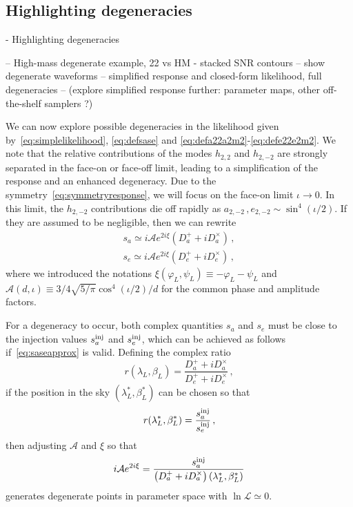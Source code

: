 \documentclass[aps,showpacs,twocolumn,prd,superscriptaddress,nofootinbib]{revtex4}
\newcommand{\be}{\begin{equation}}
\newcommand{\ee}{\end{equation}}
\newcommand{\bsub}{\begin{subequations}}
\newcommand{\esub}{\end{subequations}}
\newcommand\calL{{\mathcal{L}}}
\newcommand\calA{{\mathcal{A}}}
\newcommand\betaL{{\beta_{L}}}
\newcommand\lambdaL{{\lambda_{L}}}
\newcommand\varphiL{{\varphi_{L}}}
\newcommand\psiL{{\psi_{L}}}
\begin{document}

\subsection{Highlighting degeneracies}
\label{sec:SMBHPEdegen}

- Highlighting degeneracies

-- High-mass degenerate example, 22 vs HM - stacked SNR contours
-- show degenerate waveforms
-- simplified response and closed-form likelihood, full degeneracies
-- (explore simplified response further: parameter maps, other off-the-shelf samplers ?)

We can now explore possible degeneracies in the likelihood given by~\eqref{eq:simplelikelihood}, \eqref{eq:defsase} and \eqref{eq:defa22a2m2}-\eqref{eq:defe22e2m2}. We note that the relative contributions of the modes $h_{2,2}$ and $h_{2,-2}$ are strongly separated in the face-on or face-off limit, leading to a simplification of the response and an enhanced degeneracy. Due to the symmetry~\eqref{eq:symmetryresponse}, we will focus on the face-on limit $\iota \rightarrow 0$. In this limit, the $h_{2,-2}$ contributions die off rapidly as $a_{2,-2}\,, e_{2,-2} \sim \sin^{4} (\iota/2)$. If they are assumed to be negligible, then we can rewrite
\bsub\label{eq:saseapprox}
\begin{align}
	s_{a} \simeq i\calA e^{2 i \xi} \left( D_{a}^{+} + i D_{a}^{\times} \right) \,, \\
	s_{e} \simeq i\calA e^{2 i \xi} \left( D_{e}^{+} + i D_{e}^{\times} \right) \,,
\end{align}
\esub
where we introduced the notations $\xi (\varphiL, \psiL) \equiv -\varphiL - \psiL$ and $\calA(d, \iota) \equiv 3/4\sqrt{5/\pi}\cos^{4}(\iota/2)/d $ for the common phase and amplitude factors.

For a degeneracy to occur, both complex quantities $s_{a}$ and $s_{e}$ must be close to the injection values $s_{a}^{\rm inj}$ and $s_{e}^{\rm inj}$, which can be achieved as follows if~\eqref{eq:saseapprox} is valid. Defining the complex ratio
\be\label{eq:defr}
	r(\lambdaL, \betaL) = \frac{D_{a}^{+} + i D_{a}^{\times}}{D_{e}^{+} + i D_{e}^{\times} } \,,
\ee
if the position in the sky $(\lambda_{L}^{*}, \beta_{L}^{*})$ can be chosen so that
\be\label{eq:rcondition}
	r(\lambda_{L}^{*}, \beta_{L}^{*}) = \frac{s_{a}^{\rm inj}}{s_{e}^{\rm inj}} \,,
\ee
then adjusting $\calA$ and $\xi$ so that
\be
	i\calA e^{2 i \xi} = \frac{s_{a}^{\rm inj}}{\left( D_{a}^{+} + i D_{a}^{\times} \right)(\lambda_{L}^{*}, \beta_{L}^{*})}
\ee
generates degenerate points in parameter space with $\ln \calL \simeq 0$.
\end{document}
